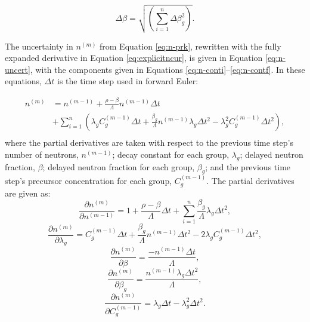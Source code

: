 \documentclass{style/nseJournal}
\begin{document}
\begin{equation}
\Delta \beta = \sqrt{ \left(\sum_{i=1}^{n} \Delta \beta_g^2 \right)}
\label{eq:beta}.
\end{equation}

The uncertainty in $n^{(m)}$ from Equation \eqref{eq:n-prk}, rewritten with the fully expanded derivative in Equation \eqref{eq:explicitncur}, is given in Equation \eqref{eq:n-uncert}, with the components given in Equations \eqref{eq:n-conti}--\eqref{eq:n-contf}. In these equations, $\Delta t$ is the time step used in forward Euler:

\begin{equation}
\begin{split}
n^{(m)} & =  n^{(m-1)} + \frac{\rho - \beta}{\Lambda} n^{(m-1)} \Delta t \\
& + \sum_{i=1}^n \left( \lambda_g C_g^{(m-1)} \Delta t + \frac{\beta_g}{\Lambda} n^{(m-1)} \lambda_g \Delta t^2- \lambda_g^2 C_g^{(m-1)} \Delta t^2 \right),\\
\label{eq:explicitncur}
\end{split}
\end{equation}
where the partial derivatives are taken with respect to the previous time step's number of neutrons, $n^{(m-1)}$; decay constant for each group, $\lambda_g$; delayed neutron fraction, $\beta$; delayed neutron fraction for each group, $\beta_g$; and the previous time step's precursor concentration for each group, $C_g^{(m-1)}$.
The partial derivatives are given as:
\begin{equation}
\frac{\partial n^{(m)}}{\partial n^{(m-1)}} = 1 + \frac{\rho - \beta}{\Lambda} \Delta t + \sum_{i=1}^{n} \frac{\beta_g}{\Lambda} \lambda_g \Delta t^2
\label{eq:n-conti},
\end{equation}
\begin{equation}
\frac{\partial n^{(m)}}{\partial \lambda_g} = C_g^{(m-1)} \Delta t + \frac{\beta_g}{\Lambda} n^{(m-1)} \Delta t^2 - 2 \lambda_g C_g^{(m-1)} \Delta t^2,
\end{equation}
\begin{equation}
\frac{\partial n^{(m)}}{\partial \beta} = \frac{-n^{(m-1)} \Delta t}{\Lambda},
\end{equation}
\begin{equation}
\frac{\partial n^{(m)}}{\partial \beta_g} = \frac{n^{(m-1)} \lambda_g \Delta t^2}{\Lambda},
\end{equation}
\begin{equation}
\frac{\partial n^{(m)}}{\partial C_g^{(m-1)}} = \lambda_g \Delta t - \lambda_g^2 \Delta t^2
\label{eq:n-contf}.
\end{equation}
\end{document}
